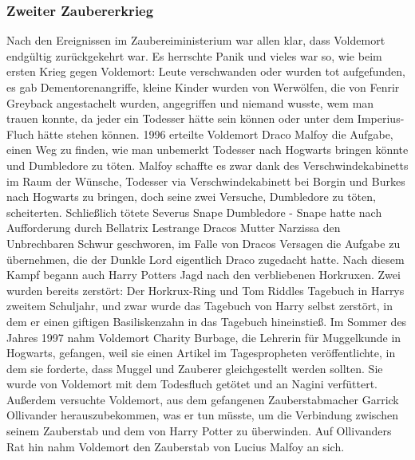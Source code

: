 \documentclass[a4paper, 10pt]{article}
\begin{document}
\subsubsection*{\large Zweiter Zaubererkrieg}
Nach den Ereignissen im Zaubereiministerium war allen klar, dass Voldemort endgültig zurückgekehrt war. Es herrschte Panik und vieles war so, wie beim ersten Krieg gegen Voldemort: Leute verschwanden oder wurden tot aufgefunden, es gab Dementorenangriffe, kleine Kinder wurden von Werwölfen, die von Fenrir Greyback angestachelt wurden, angegriffen und niemand wusste, wem man trauen konnte, da jeder ein Todesser hätte sein können oder unter dem Imperius-Fluch hätte stehen können.
\vspace{10pt}
\newline
{}  
1996 erteilte Voldemort Draco Malfoy die Aufgabe, einen Weg zu finden, wie man unbemerkt Todesser nach Hogwarts bringen könnte und Dumbledore zu töten. Malfoy schaffte es zwar dank des Verschwindekabinetts im Raum der Wünsche, Todesser via Verschwindekabinett bei Borgin und Burkes nach Hogwarts zu bringen, doch seine zwei Versuche, Dumbledore zu töten, scheiterten. Schließlich tötete Severus Snape Dumbledore - Snape hatte nach Aufforderung durch Bellatrix Lestrange Dracos Mutter Narzissa den Unbrechbaren Schwur geschworen, im Falle von Dracos Versagen die Aufgabe zu übernehmen, die der Dunkle Lord eigentlich Draco zugedacht hatte.
\vspace{10pt}
\newline
{}  
Nach diesem Kampf begann auch Harry Potters Jagd nach den verbliebenen Horkruxen. Zwei wurden bereits zerstört: Der Horkrux-Ring und Tom Riddles Tagebuch in Harrys zweitem Schuljahr, und zwar wurde das Tagebuch von Harry selbst zerstört, in dem er einen giftigen Basiliskenzahn in das Tagebuch hineinstieß.
\vspace{10pt}
\newline
{}  
Im Sommer des Jahres 1997 nahm Voldemort Charity Burbage, die Lehrerin für Muggelkunde in Hogwarts, gefangen, weil sie einen Artikel im Tagespropheten veröffentlichte, in dem sie forderte, dass Muggel und Zauberer gleichgestellt werden sollten. Sie wurde von Voldemort mit dem Todesfluch getötet und an Nagini verfüttert. Außerdem versuchte Voldemort, aus dem gefangenen Zauberstabmacher Garrick Ollivander herauszubekommen, was er tun müsste, um die Verbindung zwischen seinem Zauberstab und dem von Harry Potter zu überwinden. Auf Ollivanders Rat hin nahm Voldemort den Zauberstab von Lucius Malfoy an sich.
\end{document}
